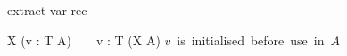 \begin{circuslaw}{extract-var-rec}
\begin{circusaction*}
  \circmu X \circspot (\circvar v : T \circspot A) ~ \equiv ~ \circvar v : T \circspot (\circmu X \circspot A)
  \also
  \provided \; \mbox{$v$ is initialised before use in $A$}
\end{circusaction*}
\end{circuslaw}
